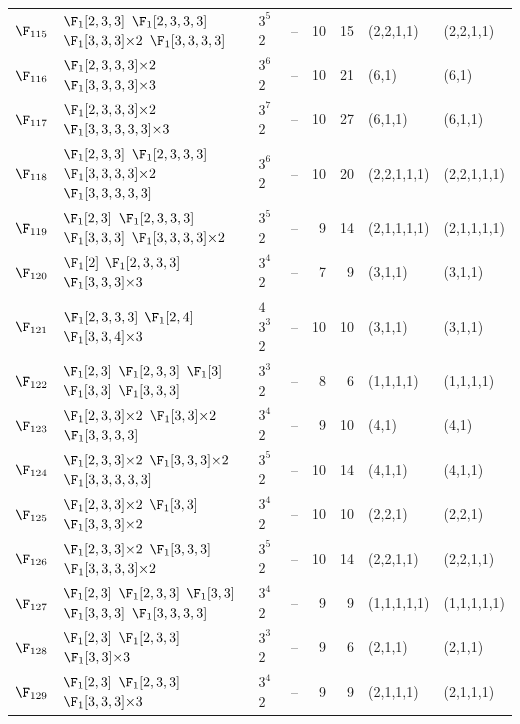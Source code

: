 \begin{landscape}
{\begin{longtable}{@{}l p{8.2cm} l l r r l l@{}}
$\F_{115}$ & $\F_{1}[2,3,3]$\; $\F_{1}[2,3,3,3]$\; $\F_{1}[3,3,3]{\times}2$\; $\F_{1}[3,3,3,3]$ & $3^{5}$\,$2$ & -- & 10 & 15 & (2,2,1,1) & (2,2,1,1) \\
$\F_{116}$ & $\F_{1}[2,3,3,3]{\times}2$\; $\F_{1}[3,3,3,3]{\times}3$ & $3^{6}$\,$2$ & -- & 10 & 21 & (6,1) & (6,1) \\
$\F_{117}$ & $\F_{1}[2,3,3,3]{\times}2$\; $\F_{1}[3,3,3,3,3]{\times}3$ & $3^{7}$\,$2$ & -- & 10 & 27 & (6,1,1) & (6,1,1) \\
$\F_{118}$ & $\F_{1}[2,3,3]$\; $\F_{1}[2,3,3,3]$\; $\F_{1}[3,3,3,3]{\times}2$\; $\F_{1}[3,3,3,3,3]$ & $3^{6}$\,$2$ & -- & 10 & 20 & (2,2,1,1,1) & (2,2,1,1,1) \\
$\F_{119}$ & $\F_{1}[2,3]$\; $\F_{1}[2,3,3,3]$\; $\F_{1}[3,3,3]$\; $\F_{1}[3,3,3,3]{\times}2$ & $3^{5}$\,$2$ & -- & 9 & 14 & (2,1,1,1,1) & (2,1,1,1,1) \\
$\F_{120}$ & $\F_{1}[2]$\; $\F_{1}[2,3,3,3]$\; $\F_{1}[3,3,3]{\times}3$ & $3^{4}$\,$2$ & -- & 7 & 9 & (3,1,1) & (3,1,1) \\
$\F_{121}$ & $\F_{1}[2,3,3,3]$\; $\F_{1}[2,4]$\; $\F_{1}[3,3,4]{\times}3$ & $4$\,$3^{3}$\,$2$ & -- & 10 & 10 & (3,1,1) & (3,1,1) \\
$\F_{122}$ & $\F_{1}[2,3]$\; $\F_{1}[2,3,3]$\; $\F_{1}[3]$\; $\F_{1}[3,3]$\; $\F_{1}[3,3,3]$ & $3^{3}$\,$2$ & -- & 8 & 6 & (1,1,1,1) & (1,1,1,1) \\
$\F_{123}$ & $\F_{1}[2,3,3]{\times}2$\; $\F_{1}[3,3]{\times}2$\; $\F_{1}[3,3,3,3]$ & $3^{4}$\,$2$ & -- & 9 & 10 & (4,1) & (4,1) \\
$\F_{124}$ & $\F_{1}[2,3,3]{\times}2$\; $\F_{1}[3,3,3]{\times}2$\; $\F_{1}[3,3,3,3,3]$ & $3^{5}$\,$2$ & -- & 10 & 14 & (4,1,1) & (4,1,1) \\
$\F_{125}$ & $\F_{1}[2,3,3]{\times}2$\; $\F_{1}[3,3]$\; $\F_{1}[3,3,3]{\times}2$ & $3^{4}$\,$2$ & -- & 10 & 10 & (2,2,1) & (2,2,1) \\
$\F_{126}$ & $\F_{1}[2,3,3]{\times}2$\; $\F_{1}[3,3,3]$\; $\F_{1}[3,3,3,3]{\times}2$ & $3^{5}$\,$2$ & -- & 10 & 14 & (2,2,1,1) & (2,2,1,1) \\
$\F_{127}$ & $\F_{1}[2,3]$\; $\F_{1}[2,3,3]$\; $\F_{1}[3,3]$\; $\F_{1}[3,3,3]$\; $\F_{1}[3,3,3,3]$ & $3^{4}$\,$2$ & -- & 9 & 9 & (1,1,1,1,1) & (1,1,1,1,1) \\
$\F_{128}$ & $\F_{1}[2,3]$\; $\F_{1}[2,3,3]$\; $\F_{1}[3,3]{\times}3$ & $3^{3}$\,$2$ & -- & 9 & 6 & (2,1,1) & (2,1,1) \\
$\F_{129}$ & $\F_{1}[2,3]$\; $\F_{1}[2,3,3]$\; $\F_{1}[3,3,3]{\times}3$ & $3^{4}$\,$2$ & -- & 9 & 9 & (2,1,1,1) & (2,1,1,1) \\

\end{longtable}}
\end{landscape}
